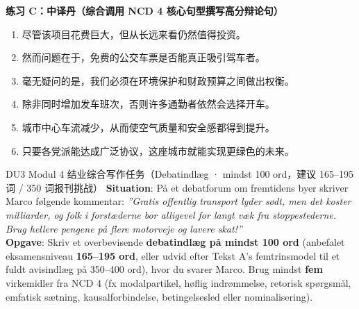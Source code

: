 \textbf{练习 C：中译丹（综合调用 NCD 4 核心句型撰写高分辩论句）}
\begin{enumerate}
  \item 尽管该项目花费巨大，但从长远来看仍然值得投资。
  \item 然而问题在于，免费的公交车票是否能真正吸引驾车者。
  \item 毫无疑问的是，我们必须在环境保护和财政预算之间做出权衡。
  \item 除非同时增加发车班次，否则许多通勤者依然会选择开车。
  \item 城市中心车流减少，从而使空气质量和安全感都得到提升。
  \item 只要各党派能达成广泛协议，这座城市就能实现更绿色的未来。
\end{enumerate}


\begin{emailbox}{DU3 Modul 4 结业综合写作任务（Debatindlæg · mindst 100 ord，建议 165--195 词 / 350 词报刊挑战）}
\textbf{Situation}: På et debatforum om fremtidens byer skriver Marco følgende kommentar:\newline
\textit{”Gratis offentlig transport lyder sødt, men det koster milliarder, og folk i forstæderne bor alligevel for langt væk fra stoppestederne. Brug hellere pengene på flere motorveje og lavere skat!”}\\[3pt]
\textbf{Opgave}: Skriv et overbevisende \textbf{debatindlæg på mindst 100 ord} (anbefalet eksamensniveau \textbf{165--195 ord}, eller udvid efter Tekst A's femtrinsmodel til et fuldt avisindlæg på 350--400 ord), hvor du svarer Marco. Brug mindst \textbf{fem} virkemidler fra NCD 4 (fx modalpartikel, høflig indrømmelse, retorisk spørgsmål, emfatisk sætning, kausalforbindelse, betingelsesled eller nominalisering).
\end{emailbox}

